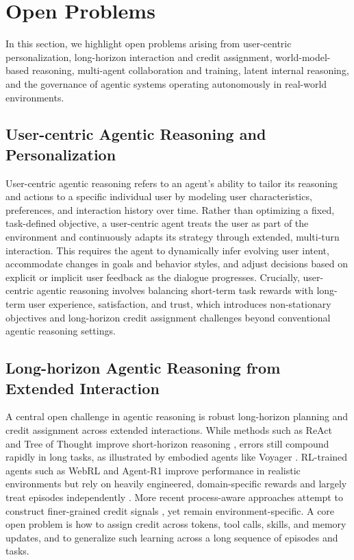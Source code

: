 \section{Open Problems}
\label{sec:openproblems}

In this section, we highlight open problems arising from user-centric personalization, long-horizon interaction and credit assignment, world-model-based reasoning, multi-agent collaboration and training, latent internal reasoning, and the governance of agentic systems operating autonomously in real-world environments.


\subsection{User-centric Agentic Reasoning and Personalization}
User-centric agentic reasoning \cite{qian2025userrl,li2025hello} refers to an agent’s ability to tailor its reasoning and actions to a specific individual user by modeling user characteristics, preferences, and interaction history over time. Rather than optimizing a fixed, task-defined objective, a user-centric agent treats the user as part of the environment and continuously adapts its strategy through extended, multi-turn interaction. This requires the agent to dynamically infer evolving user intent, accommodate changes in goals and behavior styles, and adjust decisions based on explicit or implicit user feedback as the dialogue progresses. Crucially, user-centric agentic reasoning involves balancing short-term task rewards with long-term user experience, satisfaction, and trust, which introduces non-stationary objectives and long-horizon credit assignment challenges beyond conventional agentic reasoning settings.

\subsection{Long-horizon Agentic Reasoning from Extended Interaction}
A central open challenge in agentic reasoning is robust long-horizon planning and credit assignment across extended interactions. While methods such as ReAct and Tree of Thought improve short-horizon reasoning \citep{yao2023react,yao2023tree}, errors still compound rapidly in long tasks, as illustrated by embodied agents like Voyager \citep{wang2023voyager}. RL-trained agents such as WebRL and Agent-R1 improve performance in realistic environments but rely on heavily engineered, domain-specific rewards and largely treat episodes independently \citep{qi2024webrl,wei2025webagent}. More recent process-aware approaches attempt to construct finer-grained credit signals \citep{xiang2024retrospex,yan2025memoryr1,ji2025tree}, yet remain environment-specific. A core open problem is how to assign credit across tokens, tool calls, skills, and memory updates, and to generalize such learning across a long sequence of episodes and tasks.

